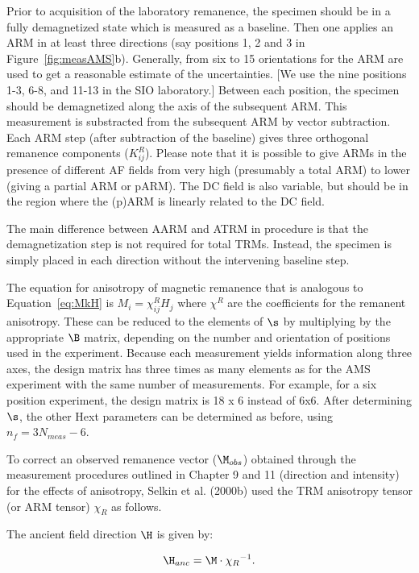  Prior to acquisition of the laboratory remanence, the specimen should be in a fully demagnetized state which is measured as a baseline.  Then one applies an  ARM  in at least three directions (say positions 1, 2 and 3 in Figure~\ref{fig:measAMS}b).   Generally, from six to 15 orientations for the ARM are used to get a reasonable estimate of the uncertainties.  [We use the nine positions 1-3, 6-8, and 11-13 in the SIO laboratory.]  Between each position, the specimen should be demagnetized along the axis of the subsequent ARM.  This measurement is  substracted from the subsequent ARM by vector subtraction.    Each  ARM step (after subtraction of the baseline)   gives  three orthogonal  remanence components    ($K^R_{ij}$).   Please note that it is possible to give ARMs in the presence of different AF fields from very high (presumably a total ARM) to lower (giving a partial ARM or pARM).  The DC field is also variable, but should be in the region where the (p)ARM is linearly related to the DC field. 
 
 The main difference between AARM and ATRM in procedure is that the demagnetization step is not required for total  TRMs.  Instead, the specimen is simply placed in each direction without the intervening baseline step.
 
 The equation for anisotropy of magnetic remanence that is analogous to  Equation~\ref{eq:MkH} is $ M_i= \chi^R_{ij} H_j $ where $\chi^R$ are the coefficients for the remanent anisotropy.     These can be reduced to the elements of $\s$ by multiplying by the appropriate $\B$ matrix, depending on the number and orientation of positions used in the experiment.  Because each measurement yields information along three axes, the design matrix has three times as many elements as for the AMS experiment with the same number of measurements.  For example, for a six position experiment, the design matrix is 18 x 6 instead of 6x6.      After determining $\s$, the other Hext parameters can be determined as before, using $n_f=3N_{meas} -6$.
 
 To correct an observed remanence vector ($\M_{obs}$) obtained through the measurement procedures outlined in Chapter 9 and 11 (direction and intensity) for the effects of anisotropy, 
 Selkin et al. (2000b) 
 \nocite{selkin00b} 
 used  the TRM anisotropy tensor (or ARM tensor) $\chi_R$ as follows.  
 
 The ancient field direction $\H$ is given by:
 
 $$
 \H_{anc}= \M \cdot {\chi_R}^{-1}. 
 $$


